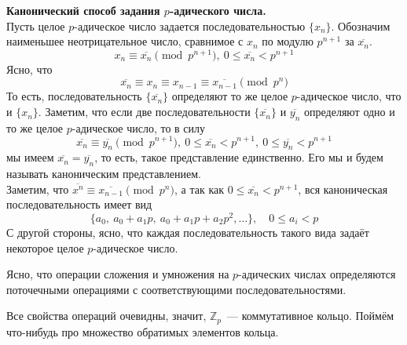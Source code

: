 \documentclass[11pt]{article}
\begin{document}
    \begin{remark} \textbf{Канонический способ задания $p$-адического числа.}\\
        Пусть целое $p$-адическое число задается последовательностью $\{ x_n \}$. Обозначим наименьшее неотрицательное
        число, сравнимое с $x_n$ по модулю $p^{n + 1}$ за $\overline{x_n}$.
        \[ x_n \equiv \overline{x_n} \pmod{p^{n + 1}}, \ 0 \le \overline{x_n} < p^{n + 1} \]
        Ясно, что
        \[ \overline{x_n} \equiv x_n \equiv x_{n - 1} \equiv \overline{x_{n - 1}} \pmod{p^n}\]
        То есть, последовательность $\{ \overline{x_n} \}$ определяют то же целое $p$-адическое число, что и $\{ x_n \}$.
        Заметим, что если две последовательности $\{ \overline{x_n} \}$ и $\overline{y_n}$ определяют одно и то же целое $p$-адическое число, то
        в силу
        \[ \overline{x_n} \equiv \overline{y_n} \pmod{p^{n + 1}}, \ 0 \le \overline{x_n} < p^{n + 1}, \ 0 \le \overline{y_n} < p^{n + 1}\]
        мы имеем $\overline{x_n} = \overline{y_n}$, то есть, такое представление единственно. Его мы и будем называть каноническим представлением. \\


        Заметим, что $\overline{x^n} \equiv \overline{x_{n - 1}} \pmod{p^n}$, а так как $0 \le \overline{x_n} < p^{n + 1}$, вся каноническая
        последовательность имеет вид
        \[ \{ a_0, \ a_0 + a_1 p, \ a_0 + a_1 p + a_2 p^2, \ldots \}, \quad 0 \le a_i < p \]
        С другой стороны, ясно, что каждая последовательность такого вида задаёт некоторое целое $p$-адическое число.
    \end{remark}

    Ясно, что операции сложения и умножения на $p$-адических числах определяются поточечными операциями с соответствующими
    последовательностями.

    Все свойства операций очевидны, значит, $\mathbb{Z}_p$~--- коммутативное кольцо. Поймём что-нибудь про множество обратимых элементов кольца.
\end{document}
